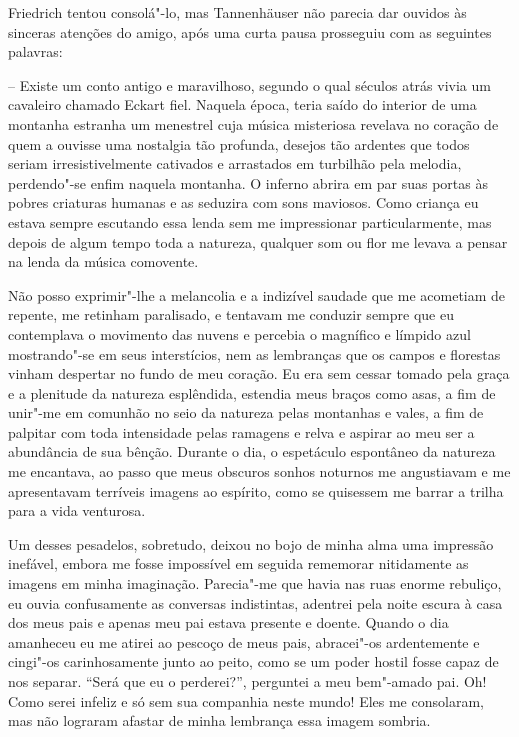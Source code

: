 Friedrich tentou consolá"-lo, mas Tannenhäuser não parecia dar ouvidos 
às sinceras atenções do amigo, após uma curta pausa prosseguiu com as
seguintes palavras:

-- Existe um conto antigo e maravilhoso, segundo o qual séculos atrás
vivia um cavaleiro chamado Eckart fiel. Naquela época, teria saído do
interior de uma montanha estranha um menestrel cuja música misteriosa
revelava no coração de quem a ouvisse uma nostalgia tão profunda,
desejos tão ardentes que todos seriam irresistivelmente cativados e
arrastados em turbilhão pela melodia, perdendo"-se enfim naquela
montanha. O inferno abrira em par suas portas às pobres criaturas
humanas e as seduzira com sons maviosos. Como criança eu estava sempre
escutando essa lenda sem me impressionar particularmente, mas depois de
algum tempo toda a natureza, qualquer som ou flor me levava a pensar na
lenda da música comovente.

Não posso exprimir"-lhe a melancolia e a indizível saudade que me
acometiam de repente, me retinham paralisado, e tentavam me
conduzir sempre que eu contemplava o movimento das nuvens e percebia
o magnífico e límpido azul mostrando"-se em seus interstícios, nem as
lembranças que os campos e florestas vinham despertar no fundo de meu
coração. Eu era sem cessar tomado pela graça e a plenitude da natureza
esplêndida, estendia meus braços como asas, a fim de unir"-me em
comunhão no seio da natureza pelas montanhas e vales, a fim de palpitar
com toda intensidade pelas ramagens e relva e aspirar ao meu ser a
abundância de sua bênção. Durante o dia, o espetáculo espontâneo da 
natureza me encantava, ao passo que meus obscuros sonhos noturnos me
angustiavam e me apresentavam terríveis imagens ao espírito, como se
quisessem me barrar a trilha para a vida venturosa.

Um desses pesadelos, sobretudo, deixou no bojo de minha alma uma
impressão inefável, embora me fosse impossível em seguida rememorar
nitidamente as imagens em minha imaginação. Parecia"-me que havia nas
ruas enorme rebuliço, eu ouvia confusamente as conversas indistintas,
adentrei pela noite escura à casa dos meus pais e apenas meu
pai estava presente e doente. Quando o dia amanheceu eu me atirei ao
pescoço de meus pais, abracei"-os ardentemente e cingi"-os carinhosamente
junto ao peito, como se um poder hostil fosse capaz de nos separar.
``Será que eu o perderei?'', perguntei a meu bem"-amado pai. Oh! Como serei
infeliz e só sem sua companhia neste mundo! Eles me consolaram, mas não
lograram afastar de minha lembrança essa imagem sombria.

